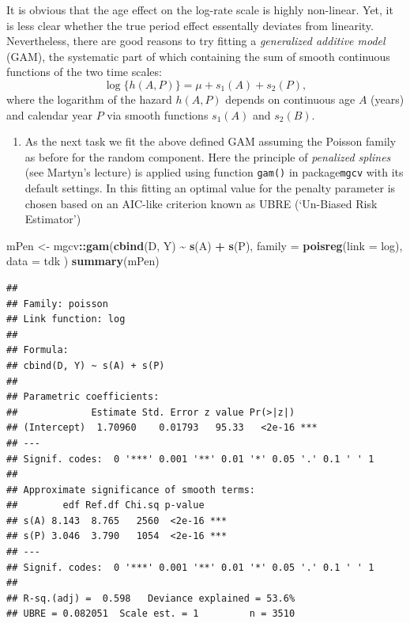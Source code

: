 \documentclass[
]{book}
\newenvironment{Shaded}{\begin{snugshade}}{\end{snugshade}}
\newcommand{\AttributeTok}[1]{\textcolor[rgb]{0.13,0.29,0.53}{#1}}
\newcommand{\FunctionTok}[1]{\textcolor[rgb]{0.13,0.29,0.53}{\textbf{#1}}}
\newcommand{\NormalTok}[1]{#1}
\newcommand{\OtherTok}[1]{\textcolor[rgb]{0.56,0.35,0.01}{#1}}
\newcommand{\SpecialCharTok}[1]{\textcolor[rgb]{0.81,0.36,0.00}{\textbf{#1}}}
\providecommand{\tightlist}{%
  \setlength{\itemsep}{0pt}\setlength{\parskip}{0pt}}
\theoremstyle{definition}
\theoremstyle{definition}
\theoremstyle{definition}
\theoremstyle{definition}
\theoremstyle{remark}
\begin{document}
It is obvious that the age effect on the log-rate scale is highly
non-linear. Yet, it is less clear whether the true period effect
essentally deviates from linearity. Nevertheless, there are good reasons
to try fitting a \emph{generalized additive model} (GAM), the systematic part
of which containing the sum of smooth continuous functions of the two
time scales: \[ \log \{h(A,P)\} = \mu + s_1(A) + s_2(P), \] where the
logarithm of the hazard \(h(A,P)\) depends on continuous age \(A\) (years)
and calendar year \(P\) via smooth functions \(s_1(A)\) and \(s_2(B)\).

\begin{enumerate}
\def\labelenumi{\arabic{enumi}.}
\tightlist
\item
  As the next task we fit the above defined GAM assuming the Poisson
  family as before for the random component. Here the principle of
  \emph{penalized splines} (see Martyn's lecture) is applied using function
  \texttt{gam()} in package\texttt{mgcv} with its default settings. In this fitting
  an optimal value for the penalty parameter is chosen based on an
  AIC-like criterion known as UBRE (`Un-Biased Risk Estimator')
\end{enumerate}

\begin{Shaded}
\begin{Highlighting}[]
\NormalTok{mPen }\OtherTok{\textless{}{-}}\NormalTok{ mgcv}\SpecialCharTok{::}\FunctionTok{gam}\NormalTok{(}\FunctionTok{cbind}\NormalTok{(D, Y) }\SpecialCharTok{\textasciitilde{}} \FunctionTok{s}\NormalTok{(A) }\SpecialCharTok{+} \FunctionTok{s}\NormalTok{(P),}
  \AttributeTok{family =} \FunctionTok{poisreg}\NormalTok{(}\AttributeTok{link =}\NormalTok{ log), }\AttributeTok{data =}\NormalTok{ tdk}
\NormalTok{)}
\FunctionTok{summary}\NormalTok{(mPen)}
\end{Highlighting}
\end{Shaded}

\begin{verbatim}
## 
## Family: poisson 
## Link function: log 
## 
## Formula:
## cbind(D, Y) ~ s(A) + s(P)
## 
## Parametric coefficients:
##             Estimate Std. Error z value Pr(>|z|)    
## (Intercept)  1.70960    0.01793   95.33   <2e-16 ***
## ---
## Signif. codes:  0 '***' 0.001 '**' 0.01 '*' 0.05 '.' 0.1 ' ' 1
## 
## Approximate significance of smooth terms:
##        edf Ref.df Chi.sq p-value    
## s(A) 8.143  8.765   2560  <2e-16 ***
## s(P) 3.046  3.790   1054  <2e-16 ***
## ---
## Signif. codes:  0 '***' 0.001 '**' 0.01 '*' 0.05 '.' 0.1 ' ' 1
## 
## R-sq.(adj) =  0.598   Deviance explained = 53.6%
## UBRE = 0.082051  Scale est. = 1         n = 3510
\end{verbatim}
\end{document}

